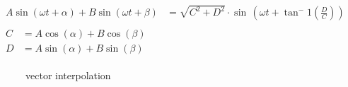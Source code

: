 \begin{align}
\begin{split}
A \sin(\omega t + \alpha) + B \sin(\omega t + \beta) &= \sqrt{C^2 + D^2} \cdot \sin \, \left( \omega t + \tan^-1 \left( \frac{D}{C} \right) \right)
\end{split}
\\
\begin{split}
C &= A \cos(\alpha)+ B \cos(\beta)\\
D &= A \sin(\alpha)+ B \sin(\beta)
\end{split} \nonumber 
\end{align}
% 
\begin{figure}[!tb]
\centering
{}
\caption{vector interpolation}
\label{fig:vectorfield_disc}
\end{figure}
